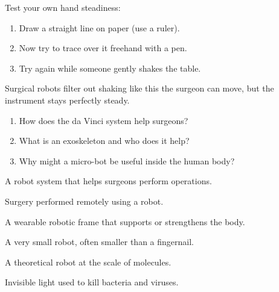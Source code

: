 \sectionrule

\begin{tryit}
  Test your own hand steadiness:
  \begin{enumerate}
    \item Draw a straight line on paper (use a ruler).
    \item Now try to trace over it freehand with a pen.
    \item Try again while someone gently shakes the table.
  \end{enumerate}
  Surgical robots filter out shaking like this \textemdash{}
  the surgeon can move, but the instrument stays perfectly steady.
\end{tryit}

\sectionrule


\begin{quickcheck}
  \begin{enumerate}
    \item How does the da Vinci system help surgeons?
    \item What is an exoskeleton and who does it help?
    \item Why might a micro-bot be useful inside the human body?
  \end{enumerate}
\end{quickcheck}

\sectionrule
\begin{newwords}
  \begin{description}[labelwidth=3.8cm, leftmargin=4.0cm]
    \item[Surgical robot] A robot system that helps surgeons perform operations.
    \item[Telesurgery] Surgery performed remotely using a robot.
    \item[Exoskeleton] A wearable robotic frame that supports or strengthens the body.
    \item[Micro-bot] A very small robot, often smaller than a fingernail.
    \item[Nano-bot] A theoretical robot at the scale of molecules.
    \item[Ultraviolet (UV)] Invisible light used to kill bacteria and viruses.
  \end{description}
\end{newwords}
